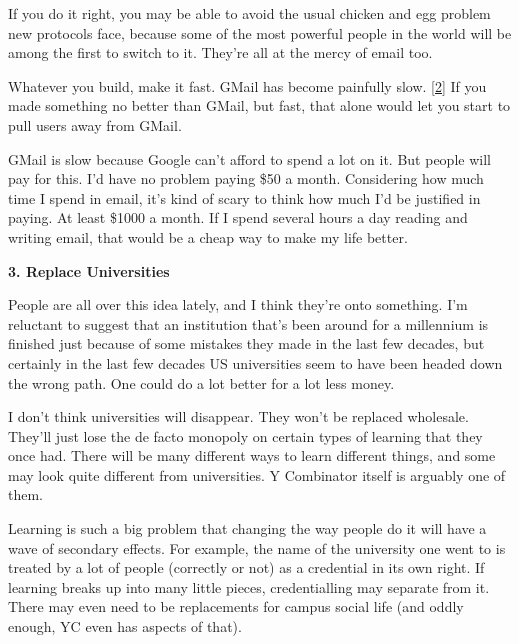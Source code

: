 If you do
                  it right, you may be able to avoid the usual chicken and egg
                  problem new protocols face, because some of the most powerful
                  people in the world will be among the first to switch to it.
                  They're all at the mercy of email too.

Whatever you
                  build, make it fast. GMail has become painfully slow.
                  [\href{\#f2n}{2}]
                  If you made something no better than GMail, but fast, that
                  alone would let you start to pull users away from GMail.

GMail
                  is slow because Google can't afford to spend a lot on it. But
                  people will pay for this. I'd have no problem paying \$50 a
                  month. Considering how much time I spend in email, it's kind
                  of scary to think how much I'd be justified in paying. At
                  least \$1000 a month. If I spend several hours a day reading
                  and writing email, that would be a cheap way to make my life
                  better.

\textbf{3. Replace Universities}

People are all over this idea lately, and I think
                  they're onto something. I'm reluctant to suggest that an
                  institution that's been around for a millennium is finished
                  just because of some mistakes they made in the last few
                  decades, but certainly in the last few decades US universities
                  seem to have been headed down the wrong path. One could do a
                  lot better for a lot less money.

I don't think
                  universities will disappear. They won't be replaced wholesale.
                  They'll just lose the de facto monopoly on certain types of
                  learning that they once had. There will be many different ways
                  to learn different things, and some may look quite different
                  from universities. Y Combinator itself is arguably one of
                  them.

Learning is such a big problem that changing
                  the way people do it will have a wave of secondary effects.
                  For example, the name of the university one went to is treated
                  by a lot of people (correctly or not) as a credential in its
                  own right. If learning breaks up into many little pieces,
                  credentialling may separate from it. There may even need to be
                  replacements for campus social life (and oddly enough, YC even
                  has aspects of that).

